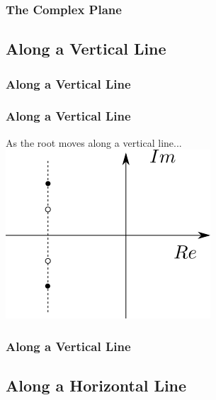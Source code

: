 \documentclass[fleqn]{beamer} %
\newcommand{\sectionIIIsubsectionItitle}{The Complex Plane}
\newcommand{\sectionIIIsubsectionIItitle}{Along a Vertical Line}
\newcommand{\sectionIIIsubsectionIIItitle}{Along a Horizontal Line}
\begin{document}
			\begin{frame}
				\frametitle{\sectionIIIsubsectionItitle}
				\bigskip

				


				\btVFill
			\end{frame}

		\subsection{\sectionIIIsubsectionIItitle}\label{sectionIIIsubsectionII}	

			\begin{frame}
				\frametitle{\sectionIIIsubsectionIItitle}
				\bigskip

				\frametitle{Along a Vertical Line}
 	
				As the root moves along a vertical line...\vspc
				\includegraphics[scale=0.5]{images/lecture3_fig2.png}


				\btVFill
			\end{frame}

			\begin{frame}
				\frametitle{\sectionIIIsubsectionIItitle}
				\bigskip


				\btVFill
			\end{frame}

		\subsection{\sectionIIIsubsectionIIItitle}\label{sectionIIIsubsectionIII}
\end{document}
